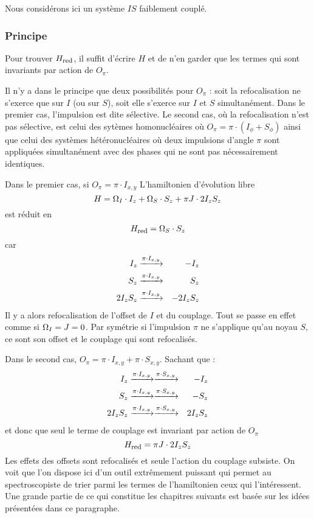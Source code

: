 Nous considérons ici un système $IS$ faiblement couplé.

\subsubsection{Principe}
Pour trouver $H_{\mbox{\footnotesize{red}}}$, il suffit d'écrire $H$ et de n'en garder que les termes qui sont
invariants par action de $O_{\pi}$.

Il n'y a dans le principe que deux possibilités pour $O_{\pi}$ :
soit la refocalisation ne s'exerce que sur $I$ (ou sur $S$),
soit elle s'exerce sur $I$ et $S$ simultanément.
Dans le premier cas, l'impulsion est dite sélective.
Le second cas, où la refocalisation n'est pas sélective, 
est celui des sytèmes homonucléaires où
$O_{\pi} = \pi \cdot (I_{\phi} + S_{\phi})$ ainsi que celui des
systèmes hétéronucléaires où deux impulsions d'angle $\pi$ sont appliquées
simultanément avec des phases qui ne sont pas nécessairement identiques.

Dans le premier cas, si $O_{\pi} = \pi \cdot I_{x,y}$
L'hamiltonien d'évolution libre
\begin{equation}
H = \Omega_I \cdot I_z + \Omega_S \cdot S_z + \pi J \cdot 2I_zS_z
\end{equation}
est réduit en
\begin{equation}
H_{\mbox{\footnotesize{red}}} = \Omega_S \cdot S_z
\end{equation}
car
\begin{eqnarray}
I_z  & \xrightarrow{\pi \cdot I_{x,y}} & -I_z \\
S_z  & \xrightarrow{\pi \cdot I_{x,y}} & S_z \\
2I_zS_z  & \xrightarrow{\pi \cdot I_{x,y}} & -2I_zS_z
\end{eqnarray}
Il y a alors refocalisation de l'offset de $I$ et du couplage.
Tout se passe en effet comme si $\Omega_I = J = 0$.
Par symétrie si l'impulsion $\pi$ ne s'applique qu'au noyau $S$,
ce sont son offset et le couplage qui sont refocalisés.

Dans le second cas, $O_{\pi} = \pi \cdot I_{x,y} + \pi \cdot S_{x,y}$.
Sachant que :
\begin{eqnarray}
I_z  & \xrightarrow{\pi \cdot I_{x,y}} 
\xrightarrow{\pi \cdot S_{x,y}} & -I_z \\
S_z  & \xrightarrow{\pi \cdot I_{x,y}} 
\xrightarrow{\pi \cdot S_{x,y}} & -S_z \\
2I_zS_z  & \xrightarrow{\pi \cdot I_{x,y}} 
\xrightarrow{\pi \cdot S_{x,y}} & 2I_zS_z
\end{eqnarray}
et donc que seul le terme de couplage est invariant par action de $O_{\pi}$
\begin{equation}
\label{eqn:hredis}
H_{\mbox{\footnotesize{red}}} = \pi J \cdot 2I_zS_z
\end{equation}
Les effets des offsets sont refocalisés et seule l'action du couplage
subsiste.
On voit que l'on dispose ici d'un outil extrêmement puissant
qui permet au spectroscopiste de trier parmi les termes de
l'hamiltonien ceux qui l'intéressent.
Une grande partie de ce qui constitue les chapitres suivants est
basée sur les idées présentées dans ce paragraphe.

